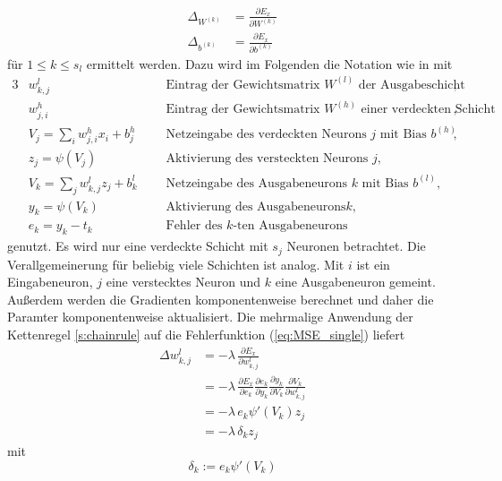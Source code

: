 \begin{align*}
    \Delta_{W^{(k)}} &= \frac{\partial E_x}{\partial W^{(k)}} \\
    \Delta_{b^{(k)}} &= \frac{\partial E_x}{\partial b^{(k)}} 
\end{align*}
für $1 \leq k \leq s_l$ ermittelt werden. Dazu wird im Folgenden die Notation wie in \cite{du_diss} mit
\begin{alignat*}{3}
    &w_{k,j}^l  &&\text{Eintrag der Gewichtsmatrix $W^{(l)}$ der Ausgabeschicht}, \\
    &w_{j,i}^h   &&\text{Eintrag der Gewichtsmatrix $W^{(h)}$ einer verdeckten Schicht}, \\
    &V_j=\sum_{i} w_{j,i}^h x_i +b^h_j \; \; \;  &&\text{Netzeingabe des verdeckten Neurons $j$ mit Bias $b^{(h)}$}, \\
    &z_{j}= \psi \left(V_j\right) &&\text{Aktivierung des versteckten Neurons $j$},\\
    &V_k=\sum_{j} w_{k,j}^l z_j +b^l_k&&\text{Netzeingabe des Ausgabeneurons $k$ mit Bias $b^{(l)}$}, \\
    &y_k=\psi(V_k) &&\text{Aktivierung des Ausgabeneurons} k,\\
    &e_k=y_k-t_k &&\text{Fehler des $k$-ten Ausgabeneurons} 
\end{alignat*}
genutzt. Es wird nur eine verdeckte Schicht mit $s_j$ Neuronen betrachtet. Die Verallgemeinerung für beliebig viele Schichten ist analog. Mit $i$ ist ein Eingabeneuron, $j$ eine verstecktes Neuron und $k$ eine Ausgabeneuron gemeint. Außerdem werden die Gradienten komponentenweise berechnet und daher die Paramter komponentenweise aktualisiert. Die mehrmalige Anwendung der Kettenregel \ref{s:chainrule} auf die Fehlerfunktion (\ref{eq:MSE_single}) liefert
\begin{align*}
    \label{eq:delta_w_out}
\Delta w_{k,j}^l &= -\lambda\,\frac{\partial E_x}{\partial w_{k,j}^l} \\
                 &= -\lambda\,\frac{\partial E_x}{\partial e_{k}}
                            \frac{\partial e_k}{\partial y_k} 
                            \frac{\partial y_k}{\partial V_k}
                            \frac{\partial V_k}{\partial w_{k,j}^l}\\
                 &= -\lambda \,e_k \psi'(V_k) z_j \\
                 &= -\lambda \,\delta_k z_j           
\end{align*} 
mit 
\begin{equation}
    \label{eq:delta_out}
    \delta_k:= e_k \psi'(V_k)
\end{equation}
